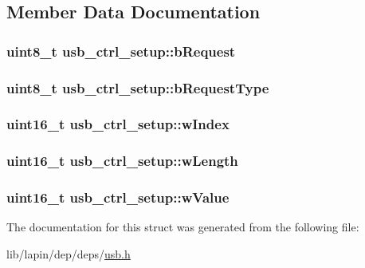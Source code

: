 \subsection{Member Data Documentation}
\hypertarget{structusb__ctrl__setup_aad44a5f779b628a7149cbd5c40fd78c8}{
\subsubsection[{b\-Request}]{\setlength{\rightskip}{0pt plus 5cm}uint8\-\_\-t usb\-\_\-ctrl\-\_\-setup\-::b\-Request}}\label{structusb__ctrl__setup_aad44a5f779b628a7149cbd5c40fd78c8}
\hypertarget{structusb__ctrl__setup_ab1f272fb865f64a82a76ee2b32d8734a}{
\subsubsection[{b\-Request\-Type}]{\setlength{\rightskip}{0pt plus 5cm}uint8\-\_\-t usb\-\_\-ctrl\-\_\-setup\-::b\-Request\-Type}}\label{structusb__ctrl__setup_ab1f272fb865f64a82a76ee2b32d8734a}
\hypertarget{structusb__ctrl__setup_a36421d32b1136a470c2ac905bebb16ff}{
\subsubsection[{w\-Index}]{\setlength{\rightskip}{0pt plus 5cm}uint16\-\_\-t usb\-\_\-ctrl\-\_\-setup\-::w\-Index}}\label{structusb__ctrl__setup_a36421d32b1136a470c2ac905bebb16ff}
\hypertarget{structusb__ctrl__setup_abd54b552fbda8d7e6a7e01f59c7e46c0}{
\subsubsection[{w\-Length}]{\setlength{\rightskip}{0pt plus 5cm}uint16\-\_\-t usb\-\_\-ctrl\-\_\-setup\-::w\-Length}}\label{structusb__ctrl__setup_abd54b552fbda8d7e6a7e01f59c7e46c0}
\hypertarget{structusb__ctrl__setup_aa5608da205f09c16cb1672572a75b87f}{
\subsubsection[{w\-Value}]{\setlength{\rightskip}{0pt plus 5cm}uint16\-\_\-t usb\-\_\-ctrl\-\_\-setup\-::w\-Value}}\label{structusb__ctrl__setup_aa5608da205f09c16cb1672572a75b87f}


The documentation for this struct was generated from the following file\-:\begin{DoxyCompactItemize}
\item 
lib/lapin/dep/deps/\hyperlink{deps_2usb_8h}{usb.\-h}\end{DoxyCompactItemize}
